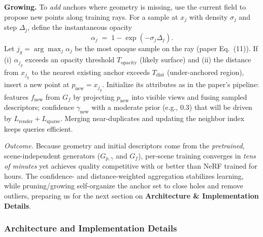 \begin{enrichment}
\begin{enrichment}
\begin{enrichment}
        \noindent\textbf{Growing.} To \emph{add} anchors where geometry is missing, use the current field to propose new points along training rays. For a sample at $x_j$ with density $\sigma_j$ and step $\Delta_j$, define the instantaneous opacity
        \[
        \alpha_j \;=\; 1 - \exp(-\sigma_j \Delta_j).
        \]
        Let $j_g=\arg\max_j \alpha_j$ be the most opaque sample on the ray (paper Eq.~(11)). If
        (i) $\alpha_{j_g}$ exceeds an opacity threshold $T_{\text{opacity}}$ (likely surface) and
        (ii) the distance from $x_{j_g}$ to the nearest existing anchor exceeds $T_{\text{dist}}$ (under-anchored region),
        insert a new point at $p_{\text{new}}=x_{j_g}$. Initialize its attributes as in the paper’s pipeline:
        features $f_{\text{new}}$ from $G_f$ by projecting $p_{\text{new}}$ into visible views and fusing sampled descriptors; confidence $\gamma_{\text{new}}$ with a moderate prior (e.g., $0.3$) that will be driven by $L_{\text{render}}{+}L_{\text{sparse}}$.
        Merging near-duplicates and updating the neighbor index keeps queries efficient.
        \medskip
        
        \noindent\emph{Outcome.} Because geometry and initial descriptors come from the \emph{pretrained}, scene-independent generators ($G_{p,\gamma}$ and $G_f$), per-scene training converges in \emph{tens of minutes} yet achieves quality competitive with or better than NeRF trained for hours. The confidence- and distance-weighted aggregation stabilizes learning, while pruning/growing self-organize the anchor set to close holes and remove outliers, preparing us for the next section on \textbf{Architecture \& Implementation Details}.
        
        \subsubsection{Architecture and Implementation Details}
        \label{subsubsec:chapter23_pointnerf_architecture}
        

\end{enrichment}
\end{enrichment}
\end{enrichment}
